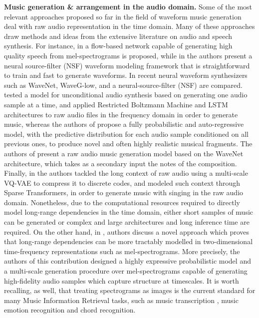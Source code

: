 \documentclass[journal]{IEEEtran}
\begin{document}
\textbf{Music generation \& arrangement in the audio domain.} Some of the most relevant approaches proposed so far in the field of waveform music generation deal with raw audio representation in the time domain. Many of these approaches draw methods and ideas from the extensive literature on audio and speech synthesis.  
For instance, in \cite{prenger2019waveglow} a flow-based network capable of generating high quality speech from mel-spectrograms is proposed, while in \cite{wang2019neural} the authors present a neural source-filter (NSF) waveform modeling framework that is straightforward to train and fast to generate waveforms. In \cite{zhao2020transferring} recent neural waveform synthesizers such as WaveNet, WaveG-low, and a neural-source-filter (NSF) are compared. \cite{mehri2016samplernn} tested a model for unconditional audio synthesis based on generating one audio sample at a time, and \cite{bhave2019music} applied Restricted Boltzmann Machine and LSTM architectures to raw audio files in the frequency domain in order to generate music, whereas the authors of \cite{oord2016wavenet} propose a fully probabilistic and auto-regressive model, with the predictive distribution for each audio sample conditioned on all previous ones, to produce novel and often highly realistic musical fragments. The authors of \cite{manzelli2018end} present a raw audio music generation model based on the WaveNet architecture, which takes as a secondary input the notes of the composition.
Finally, in \cite{dhariwal2020jukebox} the authors tackled the long context of raw audio using a multi-scale VQ-VAE to compress it to discrete codes, and modeled such context through Sparse Transformers, in order to generate music with singing in the raw audio domain. Nonetheless, due to the computational resources required to directly model long-range dependencies in the time domain, either short samples of music can be generated or complex and large architectures and long inference time are required.
On the other hand, in \cite{vasquez2019melnet}, authors discuss a novel approach which proves that long-range dependencies can be more tractably modelled in two-dimensional time-frequency representations such as mel-spectrograms. More precisely, the authors of this contribution designed a highly expressive probabilistic model and a multi-scale generation procedure over mel-spectrograms capable of generating high-fidelity audio samples which capture structure at timescales.  It is worth recalling, as well, that treating spectrograms as images is the current standard for many Music Information Retrieval tasks, such as music transcription \cite{sigtia2016end}, music emotion recognition \cite{dong2019bidirectional} and chord recognition.
\end{document}
